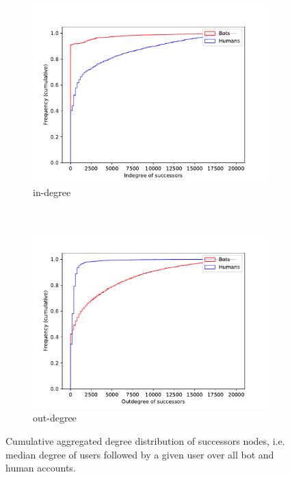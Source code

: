 \begin{figure}[t!]
    \centering
    \begin{subfigure}[t]{0.5\textwidth}
        \centering
        \includegraphics[width=\textwidth]{FIG/indegree_succ.pdf}
        \caption{in-degree}
    \end{subfigure}%
    ~ 
    \begin{subfigure}[t]{0.5\textwidth}
        \centering
        \includegraphics[width=\textwidth]{FIG/outdegree_succ.pdf}
        \caption{out-degree}
    \end{subfigure}
    \caption{Cumulative aggregated degree distribution of successors nodes, i.e. median degree of users followed by a given user over all bot and human accounts.}
    \label{fig:cum_degrees_successors}
\end{figure}

